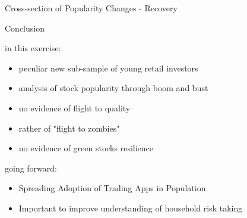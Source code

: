 \documentclass[10pt]{beamer}
\begin{document}
\begin{frame}{Cross-section of Popularity Changes - Recovery}


\pause

\centering  \vspace{-3mm}
\scalebox{0.71}{
\small

}


\end{frame}


\begin{frame}{Conclusion}

in this exercise:
\begin{itemize}[<+->]
\item peculiar new sub-sample of young retail investors
\item analysis of stock popularity through boom and bust
\item no evidence of flight to quality
\item rather of "flight to zombies"
\item no evidence of green stocks resilience
\end{itemize}
\pause \vspace{3mm}
going forward:
\begin{itemize}
\item Spreading Adoption of Trading Apps in Population
\item Important to improve understanding of household risk taking
\end{itemize}


\end{frame}
\end{document}
